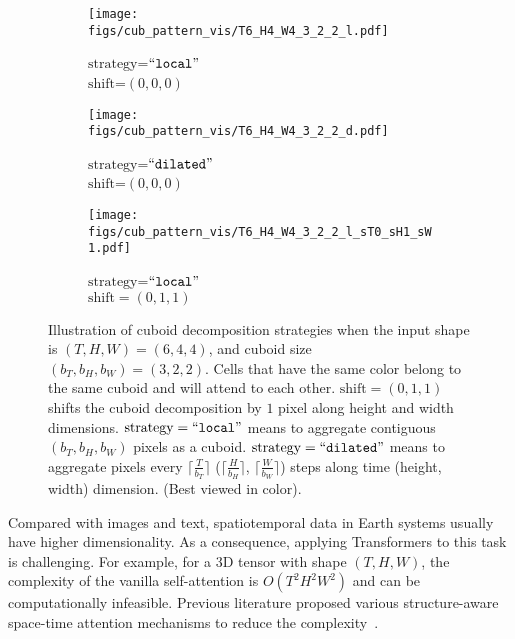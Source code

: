\documentclass{article}
\begin{document}
\begin{figure}
     \centering
     \captionsetup[subfigure]{
        format=hang,
        singlelinecheck=false,
justification=centering
     }  \hspace*{-1.0cm}
     \begin{subfigure}[b]{0.20\textwidth}
         \centering
\texttt{[image: figs/cub\_pattern\_vis/T6\_H4\_W4\_3\_2\_2\_l.pdf]}
         \vspace{-0.8cm}
         \caption{$\text{strategy}$=$\mathtt{``local"}$\protect\\ $\text{shift}$=$(0,0,0)$}
     \end{subfigure}
     \qquad
     \begin{subfigure}[b]{0.20\textwidth}
         \centering
\texttt{[image: figs/cub\_pattern\_vis/T6\_H4\_W4\_3\_2\_2\_d.pdf]}
         \vspace{-0.8cm}
         \caption{$\text{strategy}$=$\mathtt{``dilated"}$\protect\\ $\text{shift}$=$(0,0,0)$}
     \end{subfigure}
     \qquad
     \begin{subfigure}[b]{0.20\textwidth}
         \centering
\texttt{[image: figs/cub\_pattern\_vis/T6\_H4\_W4\_3\_2\_2\_l\_sT0\_sH1\_sW1.pdf]}
         \vspace{-0.8cm}
         \caption{$\text{strategy}$=$\mathtt{``local"}$\protect\\ $\text{shift}=(0,1,1)$}
     \end{subfigure}
     \caption{Illustration of cuboid decomposition strategies when the input shape is $(T, H, W) = (6, 4, 4)$, and cuboid size $(b_T, b_H, b_W) = (3, 2, 2)$. Cells that have the same color belong to the same cuboid and will attend to each other. $\text{shift} = (0,1,1)$ shifts the cuboid decomposition by $1$ pixel along height and width dimensions. $\text{strategy}=\mathtt{``local"}$ means to aggregate contiguous $(b_T, b_H, b_W)$ pixels as a cuboid. $\text{strategy}=\mathtt{``dilated"}$ means to aggregate pixels every $\lceil \frac{T}{b_T}\rceil$ ($\lceil \frac{H}{b_H}\rceil$, $\lceil \frac{W}{b_W}\rceil$) steps along time (height, width) dimension. (Best viewed in color).}
     \vspace{-1em}
     \label{fig:cuboid_pattern_illustration}
\end{figure}




Compared with images and text, spatiotemporal data in Earth systems usually have higher dimensionality. As a consequence, applying Transformers to this task is challenging.
For example, for a $3$D tensor with shape $(T, H, W)$, the complexity of the vanilla self-attention is $O(T^2 H^2 W^2)$ and can be computationally infeasible. Previous literature 
proposed various structure-aware space-time attention mechanisms to reduce the complexity~\cite{ho2019axial,liu2021video,bertasius2021space}.
\end{document}
